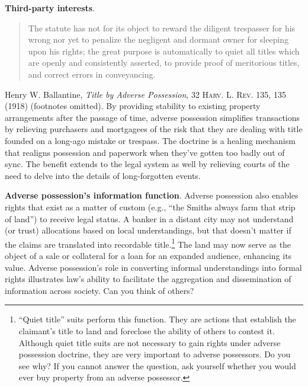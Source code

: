 \item \textbf{Third-party interests}.
\begin{quote}
The statute has not for its object to reward the diligent trespasser for his
wrong nor yet to penalize the negligent and dormant owner for sleeping upon his
rights; the great purpose is automatically to quiet all titles which are openly
and consistently asserted, to provide proof of meritorious titles, and correct
errors in conveyancing.
\end{quote}
Henry W. Ballantine, \textit{Title by Adverse Possession}, 32 \textsc{Harv. L.
Rev}. 135, 135 (1918) (footnotes omitted). By providing stability to existing
property arrangements after the passage of time, adverse possession simplifies
transactions by relieving purchasers and mortgagees of the risk that they are
dealing with title founded on a long-ago mistake or trespass. The doctrine is a
healing mechanism that realigns possession and paperwork when they've gotten
too badly out of sync. The benefit extends to the legal system as well by
relieving courts of the need to delve into the details of long-forgotten
events.

\item \textbf{Adverse possession's information function}. Adverse
possession also enables rights that exist as a matter of custom (e.g., ``the
Smiths always farm that strip of land'') to receive legal status. A banker in a
distant city may not understand (or trust) allocations based on local
understandings, but that doesn't matter if the claims are translated into
recordable title.\footnote{``Quiet title'' suits perform this function. They
are actions that establish the claimant's title to land and foreclose the
ability of others to contest it. Although quiet title suits are not necessary
to gain rights under adverse possession doctrine, they are very important to
adverse possessors. Do you see why? If you cannot answer the question, ask
yourself whether you would ever buy property from an adverse possessor.} The
land may now serve as the object of a sale or collateral for a loan for an
expanded audience, enhancing its value. Adverse possession's role in converting
informal understandings into formal rights illustrates law's ability to
facilitate the aggregation and dissemination of information across society. Can
you think of others?

